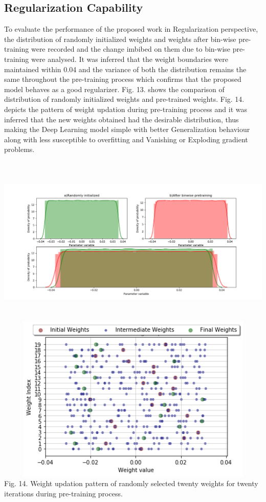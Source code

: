 \documentclass{article}
\begin{document}
\subsection{Regularization Capability}
To evaluate the performance of the proposed work in Regularization perspective, the
distribution of randomly initialized weights and weights after bin-wise pre-training
were recorded and the change imbibed on them due to bin-wise pre-training were
analysed. It was inferred that the weight boundaries were maintained within 0.04 and
the variance of both the distribution remains the same throughout the pre-training
process which confirms that the proposed model behaves as a good regularizer. Fig. 13.
shows the comparison of distribution of randomly initialized weights and pre-trained
weights. Fig. 14. depicts the pattern of weight updation during pre-training process and
it was inferred that the new weights obtained had the desirable distribution, thus
making the Deep Learning model simple with better Generalization behaviour along
with less susceptible to overfitting and Vanishing or Exploding gradient problems.
\\
\\\includegraphics[width= 15cm, height=8cm]{fig13.png}
\\\includegraphics[width= 15cm, height=8cm]{fig14.png}
\\
Fig. 14. Weight updation pattern of randomly selected twenty weights for twenty
iterations during pre-training process.
\\
\end{document}
